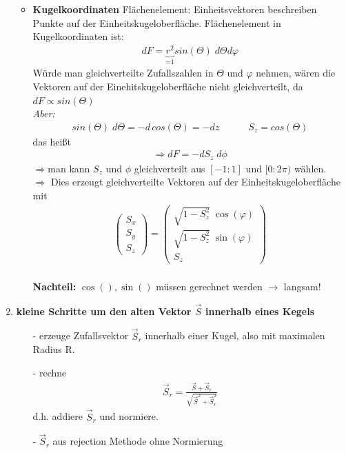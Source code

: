 \documentclass[12pt]{article}
\begin{document}
\begin{enumerate}
\begin{itemize}
			\item \textbf{Kugelkoordinaten} Flächenelement:
			Einheitsvektoren beschreiben Punkte auf der Einheitskugeloberfläche. Flächenelement in Kugelkoordinaten ist:
			\begin{align}
			dF= \underbrace{r^2}_\text{=1} sin(\Theta) \; d \Theta d\varphi
			\end{align}	
			Würde man gleichverteilte Zufallszahlen in $\Theta$ und $\varphi$ nehmen, wären die Vektoren auf der Einehitskugeloberfläche nicht gleichverteilt, da $dF \propto sin(\Theta)$ \\
			\textit{Aber:} 
			\begin{align*}
			sin(\Theta) \; d\Theta = - d \, cos(\Theta) = -dz \quad \quad \quad S_z =cos(\Theta)
			\end{align*}
			das heißt 
			\begin{align*}
			\Rightarrow dF= - d S_z \; d \phi 
			\end{align*}
			$ \Rightarrow$man kann $S_z$ und $\phi$ gleichverteilt aus $[-1:1]$ und $[0:2\pi)$ wählen. \\
			$\Rightarrow$ Dies erzeugt gleichverteilte Vektoren auf der Einheitskugeloberfläche mit
\begin{align*}
 \begin{pmatrix} S_x \\ S_y \\ S_z \end{pmatrix} =  \begin{pmatrix} \sqrt{1-S_z^2} \; \cos(\varphi) \\ \sqrt{1-S_z^2} \; \sin(\varphi) \\ S_z \end{pmatrix}
\end{align*}
			\\ 
\textbf{Nachteil:} $\cos(),\sin()$ müssen gerechnet werden $\to$ langsam!			
\end{itemize}
			
			\item \textbf{ kleine Schritte um den alten Vektor $\vec{S}$ innerhalb eines Kegels} %
			\begin{itemize}
			\item[-] erzeuge Zufallsvektor $\vec{S}_r$ innerhalb einer Kugel, also mit maximalen Radius R.
			\item[-] rechne 
			\begin{align}
			\vec{S}_r = \frac{\vec{S} + \vec{S}_r}{\sqrt{\vec{S}^2 + \vec{S}_r^2}}
			\end{align} d.h. addiere $\vec{S}_r$ und normiere.
			\item[-] $\vec{S}_r$ aus rejection Methode ohne Normierung
			\end{itemize}
			

\end{enumerate}
\end{document}
